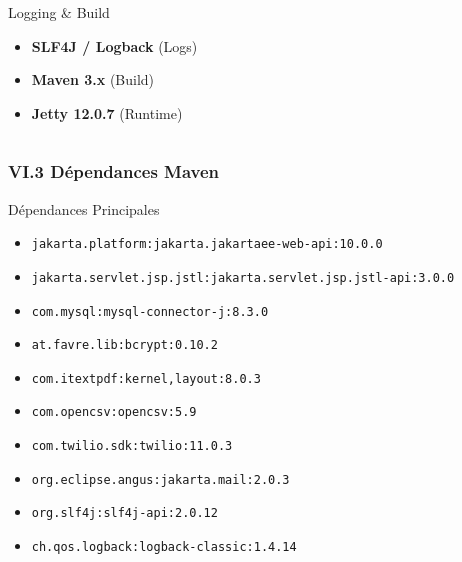 \documentclass[11pt, aspectratio=169]{beamer}
\begin{document}
\begin{frame}
\begin{columns}[T]
        \begin{block}{Logging \& Build}
            \begin{itemize}
                \item[\faFileAlt] \textbf{SLF4J / Logback} (Logs)
                \item[\faToolbox] \textbf{Maven 3.x} (Build)
                \item[\faServer] \textbf{Jetty 12.0.7} (Runtime)
            \end{itemize}
        \end{block}
    \end{columns}
\end{frame}

\begin{frame}
    \frametitle{VI.3 Dépendances Maven}
    
    \begin{small}
        \begin{block}{Dépendances Principales}
            \begin{itemize}
                \item \texttt{jakarta.platform:jakarta.jakartaee-web-api:10.0.0}
                \item \texttt{jakarta.servlet.jsp.jstl:jakarta.servlet.jsp.jstl-api:3.0.0}
                \item \texttt{com.mysql:mysql-connector-j:8.3.0}
                \item \texttt{at.favre.lib:bcrypt:0.10.2}
                \item \texttt{com.itextpdf:kernel,layout:8.0.3}
                \item \texttt{com.opencsv:opencsv:5.9}
                \item \texttt{com.twilio.sdk:twilio:11.0.3}
                \item \texttt{org.eclipse.angus:jakarta.mail:2.0.3}
                \item \texttt{org.slf4j:slf4j-api:2.0.12}
                \item \texttt{ch.qos.logback:logback-classic:1.4.14}
            \end{itemize}
        \end{block}
    \end{small}
\end{frame}

\end{document}
